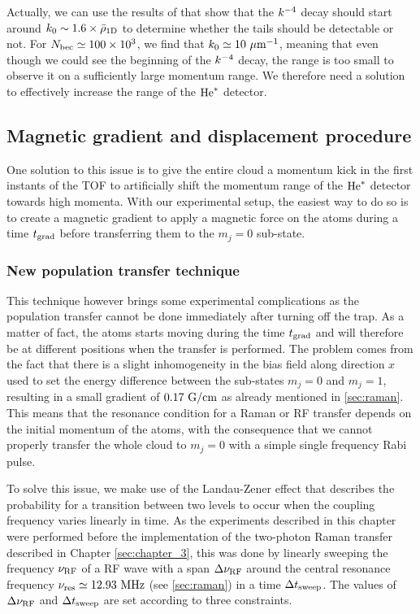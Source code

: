 Actually, we can use the results of \cite{xu2015universal} that show that the $k^{-4}$ decay should start around $k_0 \sim 1.6 \times \bar{\rho}_{\rm{1D}}$ to determine whether the tails should be detectable or not. For $N_{\rm{bec}} \simeq 100 \times 10^3$, we find that $k_0 \simeq 10 \ \mu \rm{m}^{-1}$, meaning that even though we could see the beginning of the $k^{-4}$ decay, the range is too small to observe it on a sufficiently large momentum range. We therefore need a solution to effectively increase the range of the $\mathrm{He}^*$ detector.

\subsection{Magnetic gradient and displacement procedure}

One solution to this issue is to give the entire cloud a momentum kick in the first instants of the TOF to artificially shift the momentum range of the $\mathrm{He}^*$ detector towards high momenta. With our experimental setup, the easiest way to do so is to create a magnetic gradient to apply a magnetic force on the atoms during a time $t_{\rm{grad}}$ before transferring them to the $m_j=0$ sub-state. 

\subsubsection{New population transfer technique}

This technique however brings some experimental complications as the population transfer cannot be done immediately after turning off the trap. As a matter of fact, the atoms starts moving during the time $t_{\rm{grad}}$ and will therefore be at different positions when the transfer is performed. The problem comes from the fact that there is a slight inhomogeneity in the bias field along direction $x$ used to set the energy difference between the sub-states $m_j=0$ and $m_j=1$, resulting in a small gradient of $0.17 \ \rm{G/cm}$ as already mentioned in \ref{sec:raman}. This means that the resonance condition for a Raman or RF transfer depends on the initial momentum of the atoms, with the consequence that we cannot properly transfer the whole cloud to $m_j=0$ with a simple single frequency Rabi pulse.

To solve this issue, we make use of the Landau-Zener effect that describes the probability for a transition between two levels to occur when the coupling frequency varies linearly in time. As the experiments described in this chapter were performed before the implementation of the two-photon Raman transfer described in Chapter \ref{sec:chapter_3}, this was done by linearly sweeping the frequency $\nu_{\rm{RF}}$ of a RF wave with a span $\Delta \nu_{\rm{RF}}$ around the central resonance frequency $\nu_{\rm{res}} \simeq 12.93 \ \rm{MHz}$ (see \ref{sec:raman}) in a time $\Delta t_{\rm{sweep}}$. The values of $\Delta \nu_{\rm{RF}}$ and $\Delta t_{\rm{sweep}}$ are set according to three constraints.

